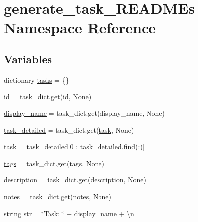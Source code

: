 \hypertarget{namespacegenerate__task__READMEs}{}\section{generate\+\_\+task\+\_\+\+R\+E\+A\+D\+M\+Es Namespace Reference}
\label{namespacegenerate__task__READMEs}
\subsection*{Variables}
\begin{DoxyCompactItemize}
\item 
dictionary \hyperlink{namespacegenerate__task__READMEs_a8f4da8ba04584af52e0e9e2f209245c2}{tasks} = \{\}
\item 
\hyperlink{namespacegenerate__task__READMEs_aaa66ad764f8d9c0957d0101c4e6a0719}{id} = task\+\_\+dict.\+get(\textquotesingle{}id\textquotesingle{}, None)
\item 
\hyperlink{namespacegenerate__task__READMEs_ae22075b887eb68b5bfef641a5deb2200}{display\+\_\+name} = task\+\_\+dict.\+get(\textquotesingle{}display\+\_\+name\textquotesingle{}, None)
\item 
\hyperlink{namespacegenerate__task__READMEs_a54940b639db498c2c79b53d5f90a5050}{task\+\_\+detailed} = task\+\_\+dict.\+get(\textquotesingle{}\hyperlink{namespacegenerate__task__READMEs_a1cd96208f46b10658c7fda64585ee590}{task}\textquotesingle{}, None)
\item 
\hyperlink{namespacegenerate__task__READMEs_a1cd96208f46b10658c7fda64585ee590}{task} = \hyperlink{namespacegenerate__task__READMEs_a54940b639db498c2c79b53d5f90a5050}{task\+\_\+detailed}\mbox{[}0 \+: task\+\_\+detailed.\+find(\textquotesingle{}\+:\textquotesingle{})\mbox{]}
\item 
\hyperlink{namespacegenerate__task__READMEs_a8de3c21c7f37d509eed7cdc5ad012c9c}{tags} = task\+\_\+dict.\+get(\textquotesingle{}tags\textquotesingle{}, None)
\item 
\hyperlink{namespacegenerate__task__READMEs_a1fa3d286642336f46142b43041428763}{description} = task\+\_\+dict.\+get(\textquotesingle{}description\textquotesingle{}, None)
\item 
\hyperlink{namespacegenerate__task__READMEs_a5589709d7fbcff4d2f00557c341334c7}{notes} = task\+\_\+dict.\+get(\textquotesingle{}notes\textquotesingle{}, None)
\item 
string \hyperlink{namespacegenerate__task__READMEs_a5b88452ffb87b78c8c85ececebafc09f}{str} = \char`\"{}Task\+: \char`\"{} + display\+\_\+name + \textquotesingle{}\textbackslash{}n\textquotesingle{}

\end{DoxyCompactItemize}
